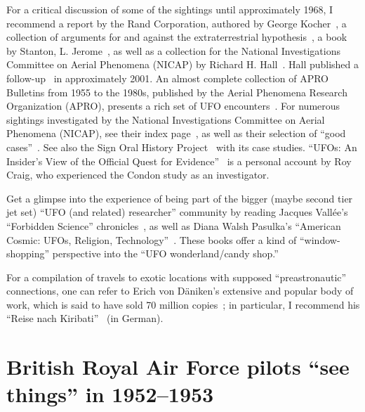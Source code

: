 For a critical discussion of some of the sightings until approximately 1968, I recommend a report by the Rand Corporation,
authored by George Kocher~\cite{Kocher-RAND-1968Jan},
a collection of arguments for and against the extraterrestrial hypothesis~\cite{Sagan1974Jan},
a book by Stanton, L. Jerome~\cite{Stanton1966Jan},
as well as a collection for the National Investigations Committee on Aerial Phenomena (NICAP) by Richard H. Hall~\cite{Hall1964}.
Hall published a follow-up~\cite{Hall2001Jan} in approximately 2001.
An almost complete collection of APRO Bulletins from 1955 to the 1980s,
published by the Aerial Phenomena Research Organization (APRO),
presents a rich set of UFO encounters~\cite{APROBulletins}.
For numerous sightings investigated by the National Investigations Committee on Aerial Phenomena (NICAP),
see their index page~\cite{NICAPIndex}, as well as their selection of ``good cases''~\cite{NICAPGC}.
See also the Sign Oral History Project~\cite{SOHPIndex} with its case studies.
``UFOs: An Insider's View of the Official Quest for Evidence''~\cite{CraigCondon1995}
is a personal account by Roy Craig, who experienced the Condon study as an investigator.




Get a glimpse into the experience of being part of the bigger (maybe second tier jet set) ``UFO (and related) researcher''
community by reading Jacques Vall\'ee's ``Forbidden Science'' chronicles~\cite{ValleeFS1,ValleeFS2,ValleeFS3,ValleeFS4,ValleeFS5},
as well as Diana Walsh Pasulka's ``American Cosmic: UFOs, Religion, Technology''~\cite{Pasulka2019Feb}.
These books offer a kind of ``window-shopping'' perspective into the ``UFO wonderland/candy shop.''



For a compilation of travels to exotic locations with supposed ``preastronautic'' connections, one can refer to Erich von D\"aniken's
extensive and popular body of work, which is said to have sold 70 million copies~\cite{vonDanikenKopp2015Apr}; in particular, I recommend his
``Reise nach Kiribati''~\cite{vonDanikenKiribati1981Jan} (in German).




\section{British Royal Air Force pilots ``see things'' in 1952--1953}\label{2023-UFO-chapter-History--1953-2016-brafpst}

